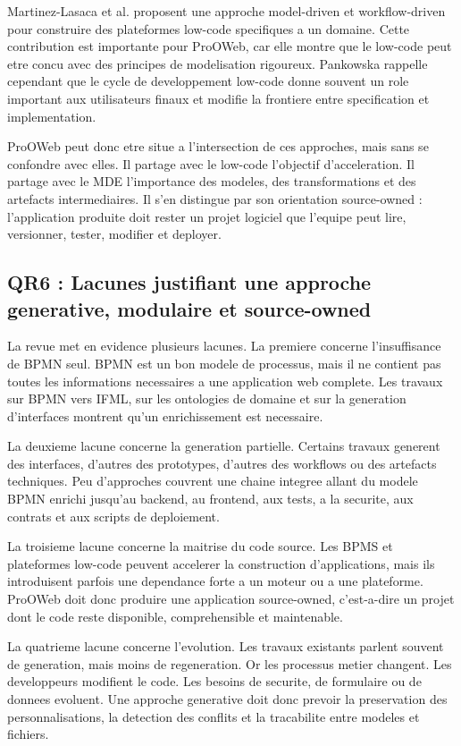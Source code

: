 \documentclass[12pt,a4paper]{article}
\begin{document}
Martinez-Lasaca et al. \cite{martinez2026} proposent une approche model-driven et workflow-driven pour construire des plateformes low-code specifiques a un domaine. Cette contribution est importante pour ProOWeb, car elle montre que le low-code peut etre concu avec des principes de modelisation rigoureux. Pankowska \cite{pankowska2024} rappelle cependant que le cycle de developpement low-code donne souvent un role important aux utilisateurs finaux et modifie la frontiere entre specification et implementation.

ProOWeb peut donc etre situe a l'intersection de ces approches, mais sans se confondre avec elles. Il partage avec le low-code l'objectif d'acceleration. Il partage avec le MDE l'importance des modeles, des transformations et des artefacts intermediaires. Il s'en distingue par son orientation source-owned : l'application produite doit rester un projet logiciel que l'equipe peut lire, versionner, tester, modifier et deployer.

\subsection{QR6 : Lacunes justifiant une approche generative, modulaire et source-owned}

La revue met en evidence plusieurs lacunes. La premiere concerne l'insuffisance de BPMN seul. BPMN est un bon modele de processus, mais il ne contient pas toutes les informations necessaires a une application web complete. Les travaux sur BPMN vers IFML, sur les ontologies de domaine et sur la generation d'interfaces montrent qu'un enrichissement est necessaire.

La deuxieme lacune concerne la generation partielle. Certains travaux generent des interfaces, d'autres des prototypes, d'autres des workflows ou des artefacts techniques. Peu d'approches couvrent une chaine integree allant du modele BPMN enrichi jusqu'au backend, au frontend, aux tests, a la securite, aux contrats et aux scripts de deploiement.

La troisieme lacune concerne la maitrise du code source. Les BPMS et plateformes low-code peuvent accelerer la construction d'applications, mais ils introduisent parfois une dependance forte a un moteur ou a une plateforme. ProOWeb doit donc produire une application source-owned, c'est-a-dire un projet dont le code reste disponible, comprehensible et maintenable.

La quatrieme lacune concerne l'evolution. Les travaux existants parlent souvent de generation, mais moins de regeneration. Or les processus metier changent. Les developpeurs modifient le code. Les besoins de securite, de formulaire ou de donnees evoluent. Une approche generative doit donc prevoir la preservation des personnalisations, la detection des conflits et la tracabilite entre modeles et fichiers.
\end{document}
